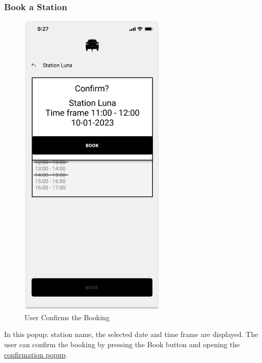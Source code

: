 \subsubsection{Book a Station}
\begin{figure}[H]
    \centering
    \includegraphics[keepaspectratio, height=15cm]{Mockup/UserAppInterface/Book Confirm.png}
    \caption{User Confirms the Booking}
    \label{pop:Booking}
\end{figure}
In this popup: station name, the selected date and time frame are displayed. The user can confirm the booking by pressing the Book button and opening the \hyperref[pop:BookingConfirmed]{confirmation popup}.

